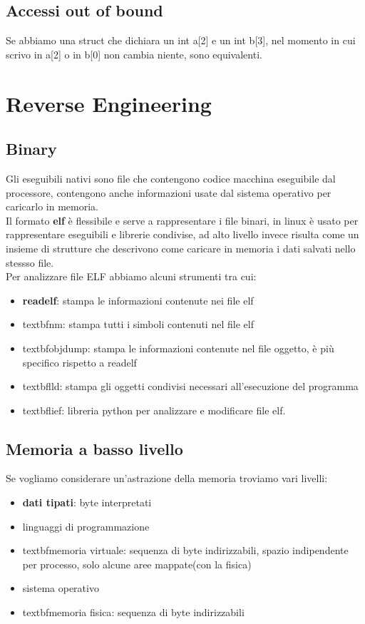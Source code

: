 \documentclass[oneside,a4paper,11pt]{book}
\theoremstyle{italicstyle}
\theoremstyle{normStyle}
\begin{document}
\subsection{Accessi out of bound}
Se abbiamo una struct che dichiara un int a[2] e un int b[3], nel momento in cui scrivo in a[2] o in b[0] non cambia niente, sono equivalenti.
\section{Reverse Engineering}
\subsection{Binary}
Gli eseguibili nativi sono file che contengono codice macchina eseguibile dal processore, contengono anche informazioni usate dal sistema operativo per caricarlo in memoria.\\
Il formato \textbf{elf} è flessibile e serve a rappresentare i file binari, in linux è usato per rappresentare eseguibili e librerie condivise, ad alto livello invece risulta come un insieme di strutture che descrivono come caricare in memoria i dati salvati nello stessso file.\\
Per analizzare file ELF abbiamo alcuni strumenti tra cui:
\begin{itemize}
  \item \textbf{readelf}: stampa le informazioni contenute nei file elf
  \item textbf{nm}: stampa tutti i simboli contenuti nel file elf
\item textbf{objdump}: stampa le informazioni contenute nel file oggetto, è più specifico rispetto a readelf
\item textbf{lld}: stampa gli oggetti condivisi necessari all'esecuzione del programma
\item textbf{lief}: libreria python per analizzare e modificare file elf.
\end{itemize}

\subsection{Memoria a basso livello}
Se vogliamo considerare un'astrazione della memoria troviamo vari livelli:
 \begin{itemize}
  \item \textbf{dati tipati}: byte interpretati
  \item linguaggi di programmazione
\item textbf{memoria virtuale}: sequenza di byte indirizzabili, spazio indipendente per processo, solo alcune aree mappate(con la fisica)
\item sistema operativo
\item textbf{memoria fisica}: sequenza di byte indirizzabili
\end{itemize}
\end{document}
